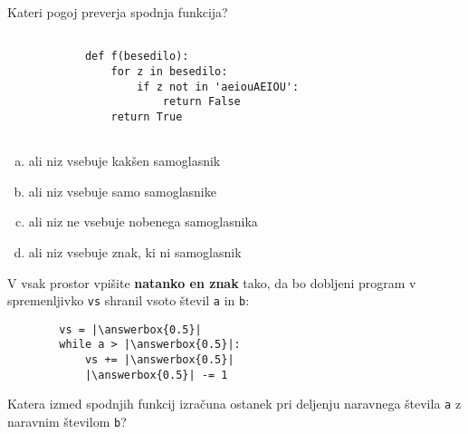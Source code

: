 \documentclass[arhiv, 10pt]{../izpit}
\newcommand{\inlinepy}[1]{\texttt{#1}}
\newcommand{\answerbox}[1]{\framebox{\vphantom{\large M}\hspace{#1cm}}}
\begin{document}
        \naloga*

        \begin{multicols}{2}
        \noindent
        Kateri pogoj preverja spodnja funkcija?
        \begin{verbatim}
        
            def f(besedilo):
                for z in besedilo:
                    if z not in 'aeiouAEIOU':
                        return False
                return True
            
        \end{verbatim}

        \begin{enumerate}[(a)]
\item ali niz vsebuje kakšen samoglasnik
\item ali niz vsebuje samo samoglasnike
\item ali niz ne vsebuje nobenega samoglasnika
\item ali niz vsebuje znak, ki ni samoglasnik
\end{enumerate}

        \end{multicols}
    
        \naloga*
        \begin{multicols}{2}
        \noindent
        V vsak prostor vpišite \textbf{natanko en znak} tako, da bo dobljeni program v spremenljivko \inlinepy{vs} shranil vsoto števil \inlinepy{a} in \inlinepy{b}:
        
        \columnbreak
        \begin{verbatim}
        vs = |\answerbox{0.5}|
        while a > |\answerbox{0.5}|:
            vs += |\answerbox{0.5}|
            |\answerbox{0.5}| -= 1
        \end{verbatim}
        \end{multicols}
    
        \clearpage
        \naloga
        
        Katera izmed spodnjih funkcij izračuna ostanek pri deljenju naravnega števila \inlinepy{a} z naravnim številom \inlinepy{b}?
    
\end{document}
